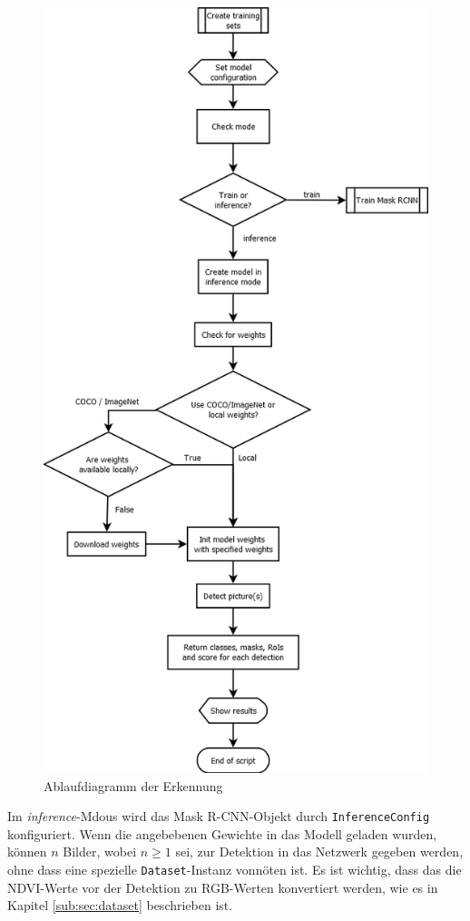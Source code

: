 \begin{figure}[ht]
  \centering
  \includegraphics[height=0.6\textheight]{pics/detect.png}
  \caption{Ablaufdiagramm der Erkennung}
  \label{fig:training}
\end{figure}
\noindent
Im \textit{inference}-Mdous wird das Mask R-CNN-Objekt durch \texttt{InferenceConfig} konfiguriert. Wenn die angebebenen Gewichte in das Modell geladen wurden, können $n$ Bilder, wobei $n\ge 1$ sei, zur Detektion in das Netzwerk gegeben werden, ohne dass eine spezielle \texttt{Dataset}-Instanz vonnöten ist. Es ist wichtig, dass das die NDVI-Werte vor der Detektion zu RGB-Werten konvertiert werden, wie es in Kapitel \ref{sub:sec:dataset} beschrieben ist.
